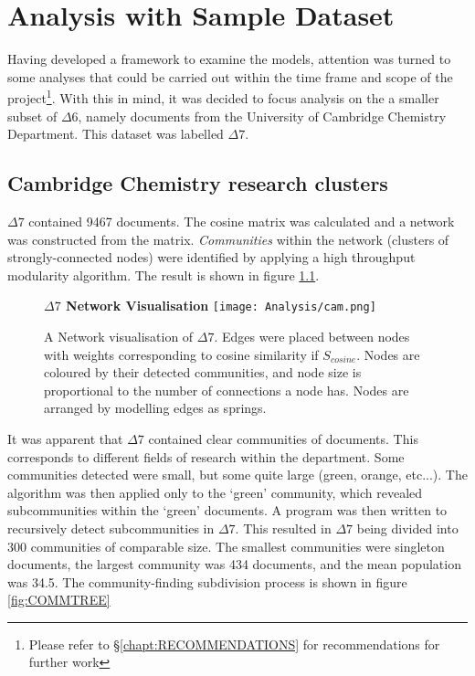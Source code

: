 \chapter{Analysis with Sample Dataset}
\label{chapt:ANALYSIS}
Having developed a framework to examine the models, attention was turned to some analyses that could be carried out within the time frame and scope of the project\footnote{Please refer to  \S\ref{chapt:RECOMMENDATIONS} for recommendations for further work}. With this in mind, it was decided to focus analysis on the a smaller subset of $\Delta6$, namely documents from the University of Cambridge Chemistry Department. This dataset was labelled $\Delta7$.
\section{Cambridge Chemistry research clusters}
\label{sec:RESEARCHCLUSTERS}
$\Delta7$ contained 9467 documents. The cosine matrix was calculated and a network was constructed from the matrix. \emph{Communities} within the network (clusters of strongly-connected nodes) were identified by applying a high throughput modularity algorithm\cite{modularity1}\cite{modularity2}. The result is shown in figure \ref{fig:CAMCOMMUNITIES}.
\begin{center}
\begin{figure}[H]
  \centering
  \textbf{$\Delta7$ Network Visualisation}
    \texttt{[image: Analysis/cam.png]}
    \caption[Network Visualisation of University of Cambridge Chemistry Department Documents]{A Network visualisation of  $\Delta7$. Edges were placed between nodes with weights corresponding to cosine similarity if $S_{cosine}$. Nodes are coloured by their detected communities, and node size is proportional to the number of connections a node has. Nodes are arranged by modelling edges as springs.}
    \label{fig:CAMCOMMUNITIES}

\end{figure} 
\end{center}
It was apparent that $\Delta7$ contained clear communities of documents. This corresponds to different fields of research within the department. Some communities detected were small, but some quite large (green, orange, etc...). The algorithm was then applied only to the `green' community, which revealed subcommunities within the `green' documents. A program was then written to recursively detect subcommunities in $\Delta7$. This resulted in $\Delta7$ being divided into 300 communities of comparable size. The smallest communities were singleton documents, the largest community was 434 documents, and the mean population was 34.5. The community-finding subdivision process is shown in figure \ref{fig:COMMTREE}
